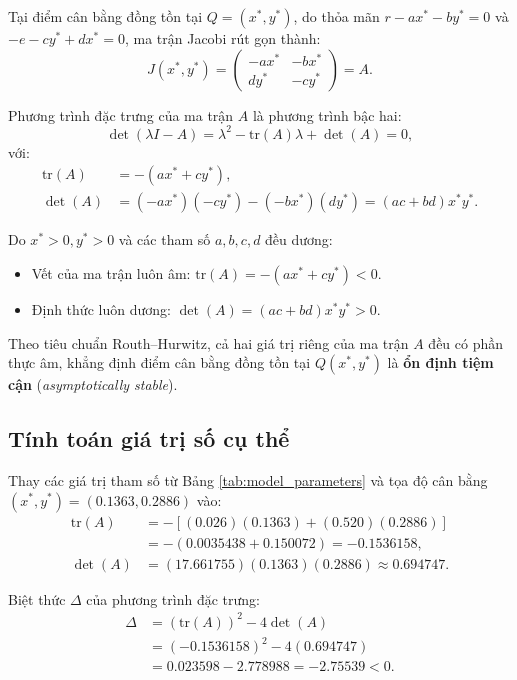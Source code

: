 Tại điểm cân bằng đồng tồn tại $Q = (x^*, y^*)$, do thỏa mãn $r - ax^* - by^* = 0$ và $-e - cy^* + dx^* = 0$, ma trận Jacobi rút gọn thành:
\begin{equation}
J(x^*, y^*) = \begin{pmatrix}
-ax^* & -bx^* \\
dy^* & -cy^*
\end{pmatrix} = A.
\end{equation}

Phương trình đặc trưng của ma trận $A$ là phương trình bậc hai:
\begin{equation}
\det(\lambda I - A) = \lambda^2 - \mathrm{tr}(A)\lambda + \det(A) = 0,
\end{equation}
với:
\begin{align}
\mathrm{tr}(A) &= -(ax^* + cy^*), \label{eq:trace_A} \\
\det(A) &= (-ax^*)(-cy^*) - (-bx^*)(dy^*) = (ac + bd)x^*y^*. \label{eq:det_A}
\end{align}

Do $x^* > 0, y^* > 0$ và các tham số $a, b, c, d$ đều dương:
\begin{itemize}
    \item Vết của ma trận luôn âm: $\mathrm{tr}(A) = -(ax^* + cy^*) < 0$.
    \item Định thức luôn dương: $\det(A) = (ac + bd)x^*y^* > 0$.
\end{itemize}
Theo tiêu chuẩn Routh--Hurwitz, cả hai giá trị riêng của ma trận $A$ đều có phần thực âm, khẳng định điểm cân bằng đồng tồn tại $Q(x^*, y^*)$ là \textbf{ổn định tiệm cận} (\textit{asymptotically stable}).

\subsection{Tính toán giá trị số cụ thể}
Thay các giá trị tham số từ Bảng \ref{tab:model_parameters} và tọa độ cân bằng $(x^*, y^*) = (0.1363, 0.2886)$ vào:
\begin{align*}
\mathrm{tr}(A) &= - \left[ (0.026)(0.1363) + (0.520)(0.2886) \right] \\
&= - (0.0035438 + 0.150072) = -0.1536158, \\[6pt]
\det(A) &= (17.661755)(0.1363)(0.2886) \approx 0.694747.
\end{align*}

Biệt thức $\Delta$ của phương trình đặc trưng:
\begin{align}
\Delta &= (\mathrm{tr}(A))^2 - 4\det(A) \nonumber \\
&= (-0.1536158)^2 - 4(0.694747) \nonumber \\
&= 0.023598 - 2.778988 = -2.75539 < 0.
\end{align}

